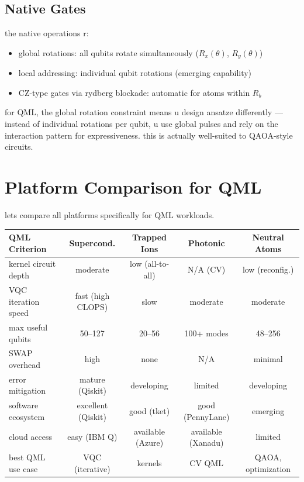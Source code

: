 \documentclass[11pt,a4paper]{article}
\theoremstyle{definition}
\theoremstyle{remark}
\begin{document}
\subsection{Native Gates}

the native operations r:
\begin{itemize}[leftmargin=*]
    \item global rotations: all qubits rotate simultaneously ($R_x(\theta)$, $R_y(\theta)$)
    \item local addressing: individual qubit rotations (emerging capability)
    \item CZ-type gates via rydberg blockade: automatic for atoms within $R_b$
\end{itemize}

for QML, the global rotation constraint means u design ansatze differently --- instead of individual rotations per qubit, u use global pulses and rely on the interaction pattern for expressiveness. this is actually well-suited to QAOA-style circuits.

\section{Platform Comparison for QML}

lets compare all platforms specifically for QML workloads.

\begin{center}
\renewcommand{\arraystretch}{1.4}
\small
\begin{tabular}{|l|c|c|c|c|}
\hline
\textbf{QML Criterion} & \textbf{Supercond.} & \textbf{Trapped Ions} & \textbf{Photonic} & \textbf{Neutral Atoms} \\
\hline
kernel circuit depth & moderate & low (all-to-all) & N/A (CV) & low (reconfig.) \\
\hline
VQC iteration speed & fast (high CLOPS) & slow & moderate & moderate \\
\hline
max useful qubits & 50--127 & 20--56 & 100+ modes & 48--256 \\
\hline
SWAP overhead & high & none & N/A & minimal \\
\hline
error mitigation & mature (Qiskit) & developing & limited & developing \\
\hline
software ecosystem & excellent (Qiskit) & good (tket) & good (PennyLane) & emerging \\
\hline
cloud access & easy (IBM Q) & available (Azure) & available (Xanadu) & limited \\
\hline
best QML use case & VQC (iterative) & kernels & CV QML & QAOA, optimization \\
\hline
\end{tabular}
\end{center}
\end{document}

